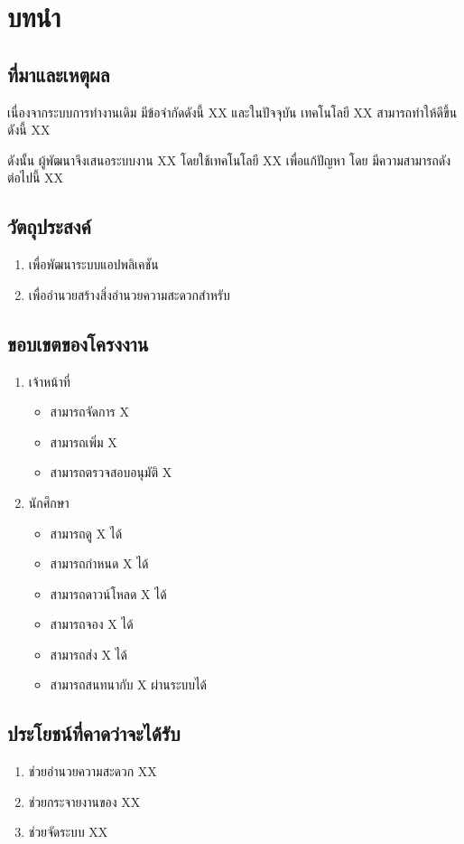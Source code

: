 \chapter{บทนำ}

\section{ที่มาและเหตุผล }
เนื่องจากระบบการทำงานเดิม มีข้อจำกัดดังนี้ XX และในปัจจุบัน เทคโนโลยี XX สามารถทำให้ดีขึ้น ดังนี้ XX

ดังนั้น ผู้พัฒนาจึงเสนอระบบงาน XX โดยใช้เทคโนโลยี XX เพื่อแก้ปัญหา โดย มีความสามารถดังต่อไปนี้ XX 


\section{วัตถุประสงค์}
\begin{enumerate}
	\item เพื่อพัฒนาระบบแอปพลิเคชัน 
	\item  เพื่ออำนวยสร้างสิ่งอำนวยความสะดวกสำหรับ 
\end{enumerate}
\section{ขอบเขตของโครงงาน}
\begin{enumerate}[label=1.3.\arabic*]
	\item เจ้าหน้าที่
	 \begin{itemize}
		 	\item สามารถจัดการ X
		 	\item สามารถเพิ่ม X
		 	\item สามารถตรวจสอบอนุมัติ X
	 \end{itemize}
	\item นักศึกษา
	\begin{itemize}
		\item สามารถดู X ได้
		\item สามารถกำหนด X ได้
		\item สามารถดาวน์โหลด X ได้
		\item สามารถจอง X ได้
		\item สามารถส่ง X ได้
		\item สามารถสนทนากับ X ผ่านระบบได้
	\end{itemize}
\end{enumerate}
\section{ประโยชน์ที่คาดว่าจะได้รับ}
\begin{enumerate}
	\item ช่วยอำนวยความสะดวก XX
	\item ช่วยกระจายงานของ XX 
  \item ช่วยจัดระบบ XX
\end{enumerate}
